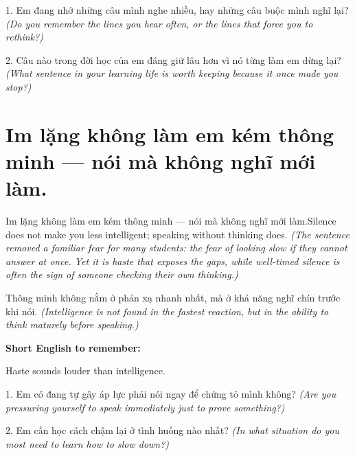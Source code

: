 \begin{tuhocnhanh}
1. Em đang nhớ những câu mình nghe nhiều, hay những câu buộc mình nghĩ lại? \textit{(Do you remember the lines you hear often, or the lines that force you to rethink?)}

2. Câu nào trong đời học của em đáng giữ lâu hơn vì nó từng làm em dừng lại? \textit{(What sentence in your learning life is worth keeping because it once made you stop?)}
\end{tuhocnhanh}
\ngancach


\section{Im lặng không làm em kém thông minh — nói mà không nghĩ mới làm.}
\begin{truyen}{Im lặng không làm em kém thông minh — nói mà không nghĩ mới làm.}{Silence does not make you less intelligent; speaking without thinking does.}
\textit{(The sentence removed a familiar fear for many students: the fear of looking slow if they cannot answer at once. Yet it is haste that exposes the gaps, while well-timed silence is often the sign of someone checking their own thinking.)}
\end{truyen}

\begin{baihoc}
Thông minh không nằm ở phản xạ nhanh nhất, mà ở khả năng nghĩ chín trước khi nói.
\textit{(Intelligence is not found in the fastest reaction, but in the ability to think maturely before speaking.)}
\end{baihoc}

\begin{ghinhoanh}
\textbf{Short English to remember:}

Haste sounds louder than intelligence.

\end{ghinhoanh}

\begin{tuhocnhanh}
1. Em có đang tự gây áp lực phải nói ngay để chứng tỏ mình không? \textit{(Are you pressuring yourself to speak immediately just to prove something?)}

2. Em cần học cách chậm lại ở tình huống nào nhất? \textit{(In what situation do you most need to learn how to slow down?)}
\end{tuhocnhanh}
\ngancach


